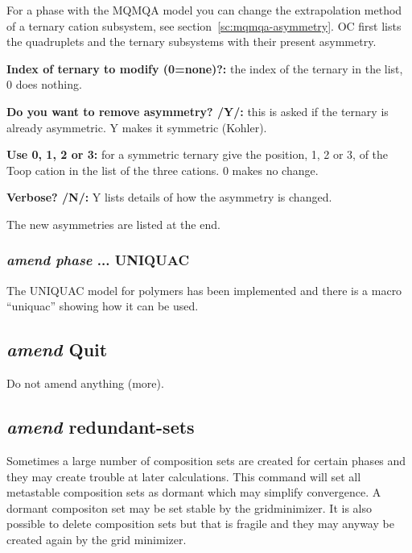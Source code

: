 \documentclass[11pt]{article}
\begin{document}
For a phase with the MQMQA model you can change the extrapolation
method of a ternary cation subsystem, see
section~\ref{sc:mqmqa-asymmetry}.  OC first lists the quadruplets and
the ternary subsystems with their present asymmetry.

{\bf Index of ternary to modify (0=none)?:} the index of the ternary
in the list, 0 does nothing.

{\bf Do you want to remove asymmetry? /Y/:} this is asked if the
ternary is already asymmetric.  Y makes it symmetric (Kohler).

{\bf Use 0, 1, 2 or 3:} for a symmetric ternary give the position, 1,
2 or 3, of the Toop cation in the list of the three cations.  0 makes
no change.

{\bf Verbose? /N/:} Y lists details of how the asymmetry is changed.

The new asymmetries are listed at the end.

\hypertarget{Amend phase UNIQUAC}{}
\subsubsection{{\em amend phase} ... UNIQUAC}

The UNIQUAC model for polymers has been implemented and there is a
macro ``uniquac'' showing how it can be used.

\hypertarget{Amend quit}{}
\subsection{{\em amend} Quit}

Do not amend anything (more).

\hypertarget{Amend redundant-sets}{}
\subsection{{\em amend} redundant-sets}

Sometimes a large number of composition sets are created for certain
phases and they may create trouble at later calculations.  This
command will set all metastable composition sets as dormant which may
simplify convergence.  A dormant compositon set may be set stable by
the gridminimizer.  It is also possible to delete composition sets but
that is fragile and they may anyway be created again by the grid
minimizer.

\hypertarget{Amend species}{}
\end{document}
